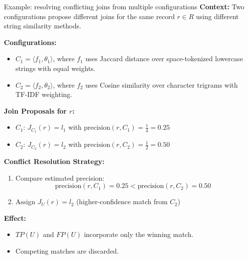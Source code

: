 \documentclass[8pt]{beamer} %
\begin{document}
\begin{frame}{Example: resolving conflicting joins from multiple configurations}
	\textbf{Context:} Two configurations propose different joins for the same record $r \in R$ using different string similarity methods.
	
	\vspace{0.5em}
	\textbf{Configurations:}
	\begin{itemize}
		\item $C_1 = \langle f_1, \theta_1 \rangle$, where $f_1$ uses Jaccard distance over space-tokenized lowercase strings with equal weights.
		\item $C_2 = \langle f_2, \theta_2 \rangle$, where $f_2$ uses Cosine similarity over character trigrams with TF-IDF weighting.
	\end{itemize}
	
	\vspace{0.5em}
	\textbf{Join Proposals for $r$:}
	\begin{itemize}
		\item $C_1$: $J_{C_1}(r) = l_1$ with $\text{precision}(r, C_1) = \frac{1}{4} = 0.25$
		\item $C_2$: $J_{C_2}(r) = l_2$ with $\text{precision}(r, C_2) = \frac{1}{2} = 0.50$
	\end{itemize}
	
	\vspace{0.5em}
	\textbf{Conflict Resolution Strategy:}
	\begin{enumerate}
		\item Compare estimated precision:
		$$
		\text{precision}(r, C_1) = 0.25 < \text{precision}(r, C_2) = 0.50
		$$
		\item Assign $J_U(r) = l_2$ (higher-confidence match from $C_2$)
	\end{enumerate}
	
	\vspace{0.5em}
	\textbf{Effect:}
	\begin{itemize}
		\item $TP(U)$ and $FP(U)$ incorporate only the winning match.
		\item Competing matches are discarded.
	\end{itemize}
\end{frame}
\end{document}
